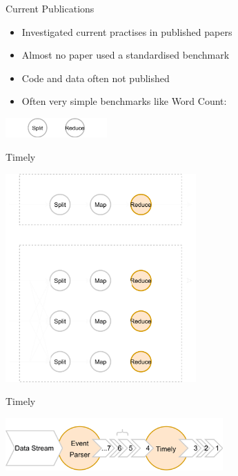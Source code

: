\documentclass[14pt,t]{beamer}
\renewcommand{\title}[1]{
  {\LARGE #1} \vskip 0.4cm
}
\begin{document}
\begin{frame}
  \title{Current Publications}
  \begin{itemize}
  \item Investigated current practises in published papers
  \item Almost no paper used a standardised benchmark
  \item Code and data often not published
  \item Often very simple benchmarks like Word Count:
  \end{itemize}
  \vspace{1cm}
  \begin{center}
    \includegraphics[height=0.75cm]{hib-3.png}
  \end{center}
\end{frame}

\begin{frame}
  \title{Timely}
  \begin{center}
    \includegraphics[height=8cm]{dataflow.png}
  \end{center}
\end{frame}

\begin{frame}
  \title{Timely}
  \vspace*{2cm}
  \begin{center}
    \includegraphics[height=2cm]{epochs.png}
  \end{center}
\end{frame}
\end{document}
